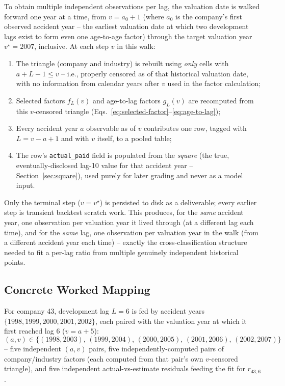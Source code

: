 \documentclass[11pt]{article}
\begin{document}
To obtain multiple independent observations per lag, the valuation date is walked forward one
year at a time, from $v = a_0 + 1$ (where $a_0$ is the company's first observed accident year --
the earliest valuation date at which two development lags exist to form even one age-to-age
factor) through the target valuation year $v^\star = 2007$, inclusive. At each step $v$ in this
walk:
\begin{enumerate}
\item The triangle (company and industry) is rebuilt using \emph{only} cells with
  $a + L - 1 \le v$ -- i.e., properly censored as of that historical valuation date, with no
  information from calendar years after $v$ used in the factor calculation;
\item Selected factors $f_{L}(v)$ and age-to-lag factors $g_L(v)$ are recomputed from this
  $v$-censored triangle (Eqs.~\ref{eq:selected-factor}--\ref{eq:age-to-lag});
\item Every accident year $a$ observable as of $v$ contributes one row, tagged with
  $L = v-a+1$ and with $v$ itself, to a pooled table;
\item The row's \texttt{actual\_paid} field is populated from the \emph{square} (the true,
  eventually-disclosed lag-10 value for that accident year -- Section~\ref{sec:square}), used
  purely for later grading and never as a model input.
\end{enumerate}
Only the terminal step ($v = v^\star$) is persisted to disk as a deliverable; every earlier step
is transient backtest scratch work. This produces, for the \emph{same} accident year, one
observation per valuation year it lived through (at a different lag each time), and for the
\emph{same} lag, one observation per valuation year in the walk (from a different accident year
each time) -- exactly the cross-classification structure needed to fit a per-lag ratio from
multiple genuinely independent historical points.

\subsection{Concrete Worked Mapping}

For company 43, development lag $L=6$ is fed by accident years $\{1998,1999,2000,2001,2002\}$,
each paired with the valuation year at which it first reached lag 6 ($v = a+5$):
\begin{equation}
(a,v) \in \bigl\{(1998,2003),\,(1999,2004),\,(2000,2005),\,(2001,2006),\,(2002,2007)\bigr\}
\end{equation}
-- five independent $(a,v)$ pairs, five independently-computed pairs of company/industry factors
(each computed from that pair's own $v$-censored triangle), and five independent actual-vs-estimate
residuals feeding the fit for $r_{43,6}$.
\end{document}
